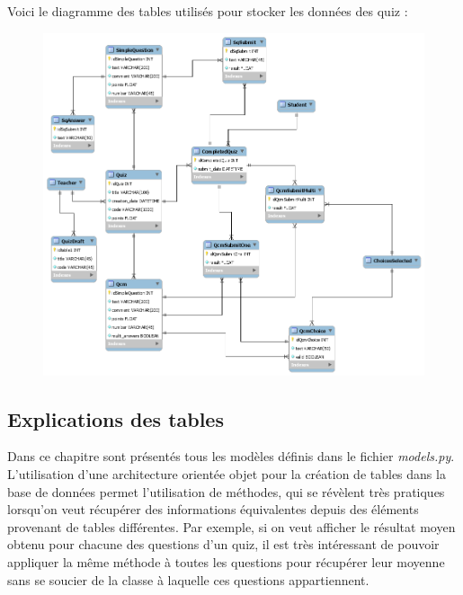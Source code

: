 \documentclass[a4,10pt,french]{sphinxmanual}
\begin{document}
Voici le diagramme des tables utilisés pour stocker les données des quiz :
\begin{figure}[htbp]
\centering

\includegraphics{quiz-models.png}
\end{figure}


\subsection{Explications des tables}
\label{database:explications-des-tables}
Dans ce chapitre sont présentés tous les modèles définis dans le fichier \emph{models.py}.
L'utilisation d'une architecture orientée objet pour la création de tables dans la base
de données permet l'utilisation de méthodes, qui se révèlent très pratiques lorsqu'on
veut récupérer des informations équivalentes depuis des éléments provenant de tables
différentes. Par exemple, si on veut afficher le résultat moyen obtenu pour chacune
des questions d'un quiz, il est très intéressant de pouvoir appliquer la même méthode
à toutes les questions pour récupérer leur moyenne sans se soucier de la classe à laquelle
ces questions appartiennent.
\end{document}
